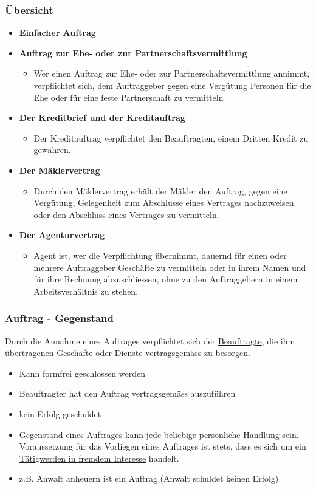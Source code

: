 \subsubsection{Übersicht}
\begin{itemize}
    \item \textbf{Einfacher Auftrag}
    \item \textbf{Auftrag zur Ehe- oder zur Partnerschaftsvermittlung}
    \begin{itemize}
        \item Wer einen Auftrag zur Ehe- oder zur Partnerschaftsvermittlung annimmt, verpflichtet sich, dem Auftraggeber gegen eine Vergütung Personen für die Ehe oder für eine feste Partnerschaft zu vermitteln
    \end{itemize}
    \item \textbf{Der Kreditbrief und der Kreditauftrag}
    \begin{itemize}
        \item Der Kreditauftrag verpflichtet den Beauftragten, einem Dritten Kredit zu gewähren.\newpage
    \end{itemize}
    \item \textbf{Der Mäklervertrag}
    \begin{itemize}
        \item Durch den Mäklervertrag erhält der Mäkler den Auftrag, gegen eine Vergütung, Gelegenheit zum Abschlusse eines Vertrages nachzuweisen oder den Abschluss eines Vertrages zu vermitteln.
    \end{itemize}
    \item \textbf{Der Agenturvertrag}
    \begin{itemize}
        \item Agent ist, wer die Verpflichtung übernimmt, dauernd für einen oder mehrere Auftraggeber Geschäfte zu vermitteln oder in ihrem Namen und für ihre Rechnung abzuschliessen, ohne zu den Auftraggebern in einem Arbeitsverhältnis zu stehen.
    \end{itemize}
\end{itemize}

\subsubsection{Auftrag - Gegenstand}
Durch die Annahme eines Auftrages verpflichtet sich der \underline{Beauftragte}, die ihm übertragenen Geschäfte oder Dienste vertragsgemäss zu besorgen.

\begin{itemize}
    \item Kann formfrei geschlossen werden
    \item Beauftragter hat den Auftrag vertragsgemäss auszuführen
    \item kein Erfolg geschuldet
    \item Gegenstand eines Auftrages kann jede beliebige \underline{persönliche Handlung} sein. Voraussetzung für das Vorliegen eines Auftrages ist stets, dass es sich um ein \underline{Tätigwerden in fremdem Interesse} handelt.
    \item z.B. Anwalt anheuern ist ein Auftrag (Anwalt schuldet keinen Erfolg)
\end{itemize}

